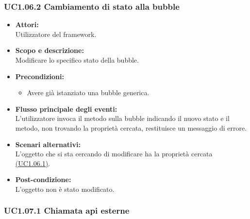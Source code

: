 \subsubsection{UC1.06.2 Cambiamento di stato alla bubble} \label{UC1.06.2}

\begin{itemize}
	\item \textbf{Attori:}
	\\Utilizzatore del framework.
	\item \textbf{Scopo e descrizione:} 
	\\Modificare lo specifico stato della bubble.
	\item \textbf{Precondizioni:}
	\begin{itemize}
		\item Avere già istanziato una bubble generica.
	\end{itemize}
	\item \textbf{Flusso principale degli eventi:}
	\\L’utilizzatore invoca il metodo sulla bubble indicando il nuovo stato e il metodo, non trovando la proprietà cercata, restituisce un messaggio di errore.
	\item \textbf{Scenari alternativi:}
	\\L'oggetto che si sta cercando di modificare ha la proprietà cercata \hyperref[UC1.06.1]{(UC1.06.1)}.
	\item \textbf{Post-condizione:}
	\\L'oggetto non è stato modificato.
\end{itemize}

\subsubsection{UC1.07.1 Chiamata api esterne} \label{UC1.07.1}

